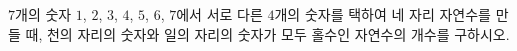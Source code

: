 $7$개의 숫자 $1$, $2$, $3$, $4$, $5$, $6$, $7$에서 서로 다른 $4$개의 숫자를 택하여 네 자리 자연수를 만들 때, 천의 자리의 숫자와 일의 자리의 숫자가 모두 홀수인 자연수의 개수를 구하시오.
